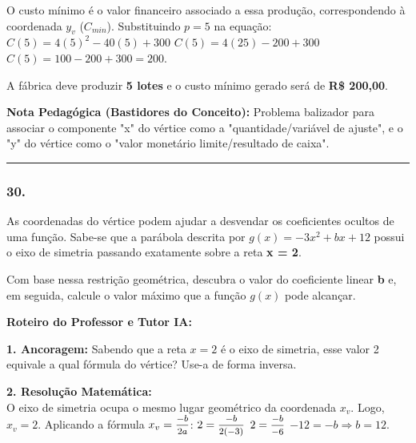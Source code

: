 \begin{multicols*}{2}
\begin{tcolorbox}[colback=CorTitUm!5, colframe=CorTitUm, boxrule=1pt, arc=4pt, left=6pt, right=6pt, top=6pt, bottom=6pt]
    O custo mínimo é o valor financeiro associado a essa produção, correspondendo à coordenada $y_v$ ($C_{min}$). Substituindo $p=5$ na equação:
    $C(5) = 4(5)^2 - 40(5) + 300$
    $C(5) = 4(25) - 200 + 300$
    $C(5) = 100 - 200 + 300 = 200$.
    
    A fábrica deve produzir \textbf{5 lotes} e o custo mínimo gerado será de \textbf{R\$ 200,00}.
    \end{tcolorbox}
    \vspace{0.15cm}
    
    \begin{boxexplicacao}
    \textbf{Nota Pedagógica (Bastidores do Conceito):} Problema balizador para associar o componente "x" do vértice como a "quantidade/variável de ajuste", e o "y" do vértice como o "valor monetário limite/resultado de caixa".
    \end{boxexplicacao}
\fi

\par\vspace{\espacoQuestao}

\noindent\textcolor{CorLinha}{\rule{\linewidth}{0.5pt}} 
\par\vspace{\espacoPreQuestao}
\subsubsection*{30.} 
\begin{enunciadoLiteral}
As coordenadas do vértice podem ajudar a desvendar os coeficientes ocultos de uma função. Sabe-se que a parábola descrita por $g(x) = -3x^2 + bx + 12$ possui o eixo de simetria passando exatamente sobre a reta \textbf{x = 2}.

Com base nessa restrição geométrica, descubra o valor do coeficiente linear \textbf{b} e, em seguida, calcule o valor máximo que a função $g(x)$ pode alcançar.
\end{enunciadoLiteral}

\ifgabarito
    \begin{tcolorbox}[colback=CorTitUm!5, colframe=CorTitUm, boxrule=1pt, arc=4pt, left=6pt, right=6pt, top=6pt, bottom=6pt]
    \small\textbf{\textcolor{CorTitUm}{Roteiro do Professor e Tutor IA:}}\par\vspace{0.1cm}
    \color{CinzaEscuro}
    \textbf{1. Ancoragem:} Sabendo que a reta $x=2$ é o eixo de simetria, esse valor 2 equivale a qual fórmula do vértice? Use-a de forma inversa.\par\vspace{0.1cm}
    \textbf{2. Resolução Matemática:}\\
    O eixo de simetria ocupa o mesmo lugar geométrico da coordenada $x_v$. Logo, $x_v = 2$.
    Aplicando a fórmula $x_v = \mfrac{-b}{2a}$:
    $2 = \mfrac{-b}{2(-3)}$
    $2 = \mfrac{-b}{-6}$
    $-12 = -b \Rightarrow b = 12$.
    

\end{tcolorbox}
\end{multicols*}
